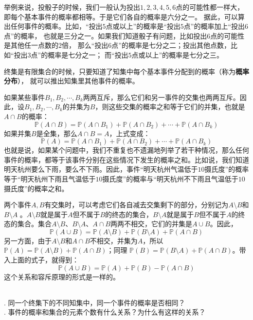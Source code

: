 \documentclass[12pt,UTF8,fontset=none]{ctexbook}
\begin{document}
举例来说，投骰子的时候，我们一般认为投出$1,2,3,4,5,6$点的可能性都一样大，
即每个基本事件的概率都相等。于是它们各自的概率是六分之一。
据此，可以算出任何事件的概率。比如，“投出$5$点或以上”的概率是“投出$5$点”的概率加上“投出$6$点”的概率，
也就是三分之一。如果我们知道骰子有问题，比如投出$6$点的可能性是其他任一点数的$2$倍，
那么“投出$6$点”的概率是七分之二；投出其他点数，比如“投出$3$点”的概率是七分之一；
而“投出$5$点或以上”的概率是七分之三。

终集是有限集合的时候，只要知道了知集中每个基本事件分配到的概率（称为\textbf{概率分布}），
就可以推出知集里其他事件的概率。

如果某些事件$B_1, B_2, \cdots, B_k$两两互斥，那么它们和另一事件的交集也两两互斥。因此，设$B_1, B_2, \cdots, B_k$的并集为$B$，则这些交集的概率之和等于它们的并集，也就是$A\cap B$的概率：
$$
\mathbb{P}(A\cap B) = \mathbb{P}(A\cap B_1) + \mathbb{P}(A\cap B_2) + \cdots + \mathbb{P}(A\cap B_k)
$$
如果并集$B$是全集，那么$A\cap B = A$，上式变成：
$$
\mathbb{P}(A) = \mathbb{P}(A\cap B_1) + \mathbb{P}(A\cap B_2) + \cdots + \mathbb{P}(A\cap B_k)
$$
也就是说，如果某个问题中，我们不重复也不遗漏地列举了若干种情况，那么任何事件的概率，都等于该事件分别在这些情况下发生的概率之和。比如说，我们知道明天杭州要么下雨，要么不下雨。因此，事件“明天杭州气温低于$10$摄氏度”的概率等于“明天杭州下雨且气温低于$10$摄氏度”的概率与“明天杭州不下雨且气温低于$10$摄氏度”的概率之和。

两个事件$A, B$有交集时，可以考虑它们各自减去交集剩下的部分，分别记为$A\setminus B$和$B\setminus A$ 。$A \setminus B$就是属于$A$但不属于$B$的终态的集合，$B \setminus A$就是属于$B$但不属于$A$的终态的集合。集合$A \setminus B$、$B \setminus A$、$A\cap B$两两不相交，它们的并集是$A\cup B$。因此，
$$
\mathbb{P}(A\cup B) = \mathbb{P}(A \setminus B) + \mathbb{P}(B \setminus A) + \mathbb{P}(A \cap B)
$$
另一方面，由于$A \setminus B$和$A\cap B$不相交，并集为$A$，所以$ \mathbb{P}(A) = \mathbb{P}(A \setminus B) +  \mathbb{P}(A \cap B)$；同理 $\mathbb{P}(B) = \mathbb{P}(B \setminus A) + \mathbb{P}(A \cap B)$。带入上面的式子，就得到：
$$
\mathbb{P}(A\cup B) = \mathbb{P}(A) + \mathbb{P}(B) - \mathbb{P}(A \cap B)
$$
这个关系和容斥原理的形式是一样的。


\begin{sk}
    \mbox{} \\
    . 同一个终集下的不同知集中，同一个事件的概率是否相同？\\
    . 事件的概率和集合的元素个数有什么关系？为什么有这样的关系？
\end{sk}
\end{document}
